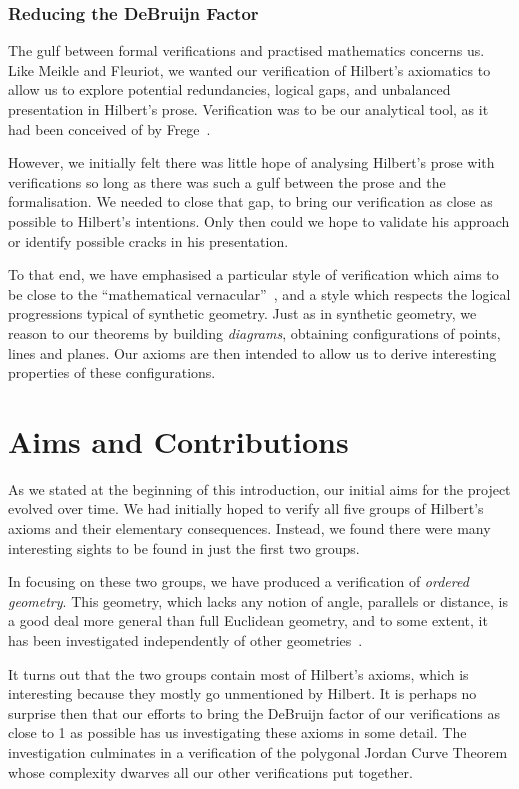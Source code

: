 \subsubsection{Reducing the DeBruijn Factor}
The gulf between formal verifications and practised mathematics concerns us. Like Meikle and Fleuriot, we wanted our verification of Hilbert's axiomatics to allow us to explore potential redundancies, logical gaps, and unbalanced presentation in Hilbert's prose. Verification was to be our analytical tool, as it had been conceived of by Frege~\cite{ProofsAboutProofs}. 

However, we initially felt there was little hope of analysing Hilbert's prose with verifications so long as there was such a gulf between the prose and the formalisation. We needed to close that gap, to bring our verification as close as possible to Hilbert's intentions. Only then could we hope to validate his approach or identify possible cracks in his presentation.

To that end, we have emphasised a particular style of verification which aims to be close to the ``mathematical vernacular''~\cite{MizarMathematicalVernacular}, and a style which respects the logical progressions typical of synthetic geometry. Just as in synthetic geometry, we reason to our theorems by building \emph{diagrams}, obtaining configurations of points, lines and planes. Our axioms are then intended to allow us to derive interesting properties of these configurations.

\section{Aims and Contributions}
As we stated at the beginning of this introduction, our initial aims for the project evolved over time. We had initially hoped to verify all five groups of Hilbert's axioms and their elementary consequences. Instead, we found there were many interesting sights to be found in just the first two groups. 

In focusing on these two groups, we have produced a verification of \emph{ordered geometry}. This geometry, which lacks any notion of angle, parallels or distance, is a good deal more general than full Euclidean geometry, and to some extent, it has been investigated independently of other geometries~\cite{AxiomaticsOrderedGeometry}.

It turns out that the two groups contain most of Hilbert's axioms, which is interesting because they mostly go unmentioned by Hilbert. It is perhaps no surprise then that our efforts to bring the DeBruijn factor of our verifications as close to 1 as possible has us investigating these axioms in some detail. The investigation culminates in a verification of the polygonal Jordan Curve Theorem whose complexity dwarves all our other verifications put together.

